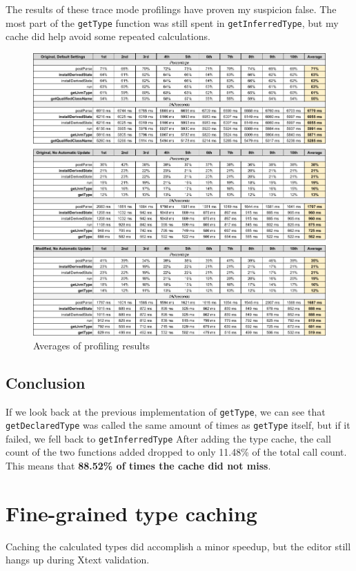 \documentclass[11pt,a4paper,oneside]{report}
\begin{document}
The results of these trace mode profilings have proven my suspicion false. The
most part of the \texttt{getType} function was still spent in
\texttt{getInferredType}, but my cache did help avoid some repeated
calculations.

\pagebreak
\begin{figure}[ht]
\centering
\includegraphics[width=150mm,keepaspectratio]{figures/measurements.png}
\caption{Averages of profiling results}
\label{fig:profiling-measurements}
\end{figure}

\subsection{Conclusion}
If we look back at the previous implementation of \texttt{getType}, we can see
that \texttt{getDeclaredType} was called the same amount of times as
\texttt{getType} itself, but if it failed, we fell back to
\texttt{getInferredType} After adding the type cache, the call count of the two
functions added dropped to only 11.48\% of the total call count. This means that
\textbf{88.52\% of times the cache did not miss}.

\pagebreak
\section{Fine-grained type caching}\label{sec:FineGrained}
Caching the calculated types did accomplish a minor speedup, but the editor
still hangs up during Xtext validation.
\end{document}
